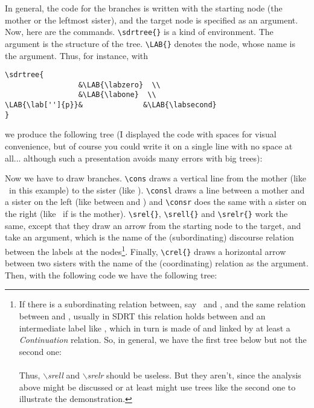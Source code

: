 \documentclass[a4paper]{article}
\begin{document}
In general, the code for the branches is written with the starting node (the mother or the leftmost sister), and the target node is specified as an argument. Now, here are the commands. \verb+\sdrtree{}+ is a kind of environment. The argument is the structure of the tree. \verb+\LAB{}+ denotes the node, whose name is the argument. Thus, for instance, with 
\begin{center}
\begin{verbatim}
\sdrtree{          
                 &\LAB{\labzero}  \\
                 &\LAB{\labone}  \\
\LAB{\lab['']{p}}&              &\LAB{\labsecond}
}
\end{verbatim}
\end{center}
we produce the following tree (I displayed the code with spaces for visual convenience, but of course you could write it on a single line with no space at all... although such a presentation avoids many errors with big trees):
\begin{center}
\end{center} 
Now we have to draw branches. \verb+\cons+ draws a vertical line from the mother (like \labzero\ in this example) to the sister (like \labone). \verb+\consl+ draws a line between a mother and a sister on the left (like between  and ) and \verb+\consr+ does the same with a sister on the right (like \labsecond\ if  is the mother). \verb+\srel{}+, \verb+\srell{}+ and \verb+\srelr{}+ work the same, except that they draw an arrow from the starting node to the target, and take an argument, which is the name of the (subordinating) discourse relation between the labels at the nodes\footnote{If there is a subordinating relation between, say \labone\ and \labtwo, and the same relation between  and , usually in SDRT this relation holds between  and an intermediate label like \labprime, which in turn is made of  and  linked by at least a \emph{Continuation} relation. So, in general, we have the first tree below but not the second one:\\\\Thus, \textit{$\backslash$srell} and \textit{$\backslash$srelr} should be useless. But they aren't, since the analysis above might be discussed or at least might use trees like the second one to illustrate the demonstration.}. Finally, \verb+\crel{}+ draws a horizontal arrow between two sisters with the name of the (coordinating) relation as the argument. Then, with the following code we have the following tree:
\end{document}
